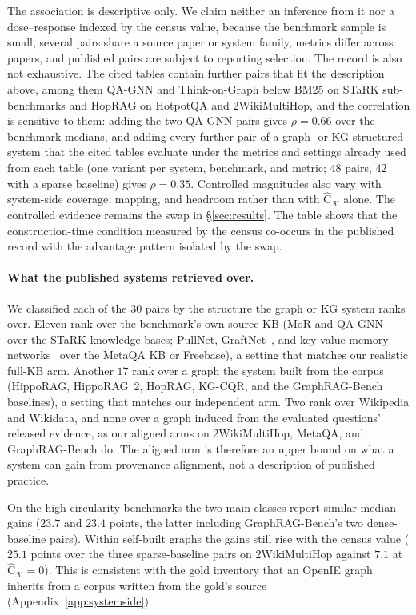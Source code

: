 \documentclass[11pt]{article}
\newcommand{\Chat}{\widehat{\mathrm{C}}}
\newcommand{\kg}{\mathcal{K}}
\begin{document}
The association is descriptive only. We claim neither an inference from it nor a dose--response indexed by the census value, because the benchmark sample is small, several pairs share a source paper or system family, metrics differ across papers, and published pairs are subject to reporting selection. The record is also not exhaustive. The cited tables contain further pairs that fit the description above, among them QA-GNN and Think-on-Graph below BM25 on STaRK sub-benchmarks and HopRAG on HotpotQA and 2WikiMultiHop, and the correlation is sensitive to them: adding the two QA-GNN pairs gives $\rho=0.66$ over the benchmark medians, and adding every further pair of a graph- or KG-structured system that the cited tables evaluate under the metrics and settings already used from each table (one variant per system, benchmark, and metric; $48$ pairs, $42$ with a sparse baseline) gives $\rho=0.35$. Controlled magnitudes also vary with system-side coverage, mapping, and headroom rather than with $\Chat_{\kg}$ alone. The controlled evidence remains the swap in \S\ref{sec:results}. The table shows that the construction-time condition measured by the census co-occurs in the published record with the advantage pattern isolated by the swap.

\paragraph{What the published systems retrieved over.} We classified each of the $30$ pairs by the structure the graph or KG system ranks over. Eleven rank over the benchmark's own source KB (MoR and QA-GNN~\citep{yasunaga2021qagnn} over the STaRK knowledge bases; PullNet, GraftNet~\citep{sun2018graftnet}, and key-value memory networks~\citep{miller2016kvmemnn} over the MetaQA KB or Freebase), a setting that matches our realistic full-KB arm. Another $17$ rank over a graph the system built from the corpus (HippoRAG, HippoRAG~2, HopRAG, KG-CQR, and the GraphRAG-Bench baselines), a setting that matches our independent arm. Two rank over Wikipedia and Wikidata, and none over a graph induced from the evaluated questions' released evidence, as our aligned arms on 2WikiMultiHop, MetaQA, and GraphRAG-Bench do. The aligned arm is therefore an upper bound on what a system can gain from provenance alignment, not a description of published practice.

On the high-circularity benchmarks the two main classes report similar median gains ($23.7$ and $23.4$ points, the latter including GraphRAG-Bench's two dense-baseline pairs). Within self-built graphs the gains still rise with the census value ($25.1$ points over the three sparse-baseline pairs on 2WikiMultiHop against $7.1$ at $\Chat_{\kg}=0$). This is consistent with the gold inventory that an OpenIE graph inherits from a corpus written from the gold's source (Appendix~\ref{app:systemside}).
\end{document}
